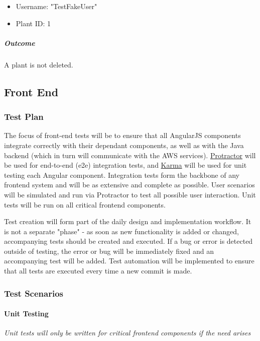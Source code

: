\documentclass{article}
\begin{document}
		\begin{itemize}
			\item Username: "TestFakeUser"
			\item Plant ID: 1
		\end{itemize}
		
		\subparagraph{Outcome}
		A plant is not deleted.
		
	\subsection{Front End}
		\subsubsection{Test Plan}
		The focus of front-end tests will be to ensure that all AngularJS components integrate correctly with their dependant components, as well as with the Java backend (which in turn will communicate with the AWS services). \href{http://www.protractortest.org/#/}{Protractor} will be used for end-to-end (e2e) integration tests, and \href{https://karma-runner.github.io/1.0/index.html}{Karma} will be used for unit testing each Angular component. Integration tests form the backbone of any frontend system and will be as extensive and complete as possible. User scenarios will be simulated and run via Protractor to test all possible user interaction. Unit tests will be run on all critical frontend components.
		
		Test creation will form part of the daily design and implementation workflow. It is not a separate "phase" - as soon as new functionality is added or changed, accompanying tests should be created and executed. If a bug or error is detected outside of testing, the error or bug will be immediately fixed and an accompanying test will be added. Test automation will be implemented to ensure that all tests are executed every time a new commit is made. 
			
		\subsubsection{Test Scenarios}
			\paragraph{Unit Testing}
				\textit{Unit tests will only be written for critical frontend components if the need arises}
\end{document}
